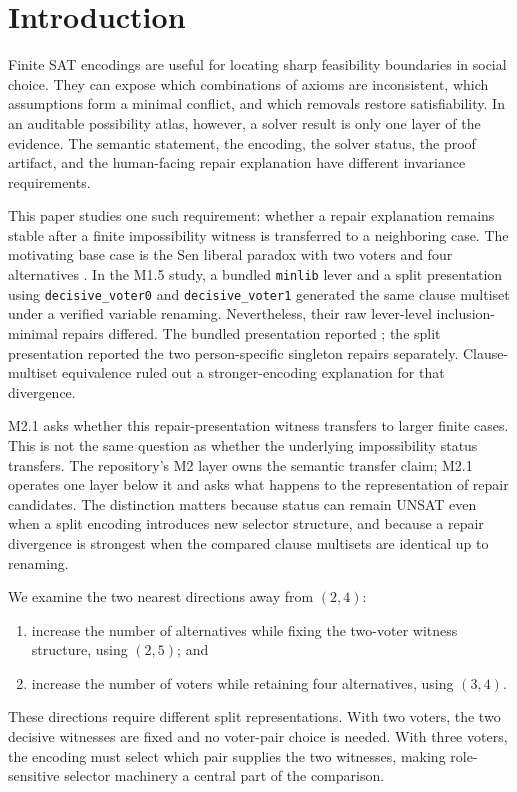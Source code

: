 \section{Introduction}\label{sec:intro}

Finite SAT encodings are useful for locating sharp feasibility boundaries in
social choice.  They can expose which combinations of axioms are inconsistent,
which assumptions form a minimal conflict, and which removals restore
satisfiability.  In an auditable possibility atlas, however, a solver result is
only one layer of the evidence.  The semantic statement, the encoding, the
solver status, the proof artifact, and the human-facing repair explanation have
different invariance requirements.

This paper studies one such requirement: whether a repair explanation remains
stable after a finite impossibility witness is transferred to a neighboring
case.  The motivating base case is the Sen liberal paradox with two voters and
four alternatives \citep{sen1970}.  In the M1.5 study, a bundled
\texttt{minlib} lever and a split presentation using
\texttt{decisive\_voter0} and \texttt{decisive\_voter1} generated the same
clause multiset under a verified variable renaming.  Nevertheless, their raw
lever-level inclusion-minimal repairs differed.  The bundled presentation
reported ; the split presentation reported the two
person-specific singleton repairs separately.  Clause-multiset equivalence
ruled out a stronger-encoding explanation for that divergence.

M2.1 asks whether this repair-presentation witness transfers to larger finite
cases.  This is not the same question as whether the underlying impossibility
status transfers.  The repository's M2 layer owns the semantic transfer claim;
M2.1 operates one layer below it and asks what happens to the representation of
repair candidates.  The distinction matters because status can remain UNSAT
even when a split encoding introduces new selector structure, and because a
repair divergence is strongest when the compared clause multisets are identical
up to renaming.

We examine the two nearest directions away from $(2,4)$:
\begin{enumerate}
  \item increase the number of alternatives while fixing the two-voter witness
  structure, using $(2,5)$; and
  \item increase the number of voters while retaining four alternatives, using
  $(3,4)$.
\end{enumerate}
These directions require different split representations.  With two voters,
the two decisive witnesses are fixed and no voter-pair choice is needed.  With
three voters, the encoding must select which pair supplies the two witnesses,
making role-sensitive selector machinery a central part of the comparison.


